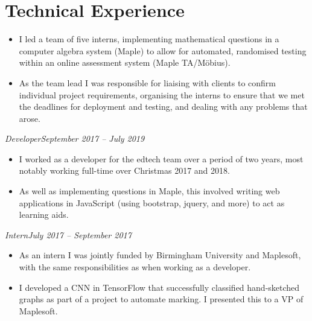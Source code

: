 \documentclass[11pt,a4paper,sans]{moderncv}        %
\begin{document}
\section{Technical Experience}
\vspace{4pt}
\vspace{0pt}
{\small \begin{itemize}
\item  I led a team of five interns, implementing mathematical questions in a computer algebra system (Maple) to allow for automated, randomised testing within an online assessment system (Maple TA/Möbius). 
\item As the team lead I was responsible for liaising with clients to confirm individual project requirements, organising the interns to ensure that we met the deadlines for deployment and testing, and dealing with any problems that arose.
\end{itemize}}
\vspace{4pt}
\textit{Developer\hfill September 2017 -- July 2019}
{\small \vspace{3pt} \begin{itemize}
\item I worked as a developer for the edtech team over a period of two years, most notably working full-time over Christmas 2017 and 2018.
\item As well as implementing questions in Maple, this involved writing web applications in JavaScript (using bootstrap, jquery, and more) to act as learning aids. 
\end{itemize}}
\vspace{4pt}
\textit{Intern\hfill July 2017 -- September 2017}
{\small \vspace{3pt} \begin{itemize}
\item As an intern I was jointly funded by Birmingham University and Maplesoft, with the same responsibilities as when working as a developer.
\item I developed a CNN in TensorFlow that successfully classified hand-sketched graphs as part of a project to automate marking. I presented this to a VP of Maplesoft.
\end{itemize}}
\pagebreak
\vspace{4pt}
\end{document}
